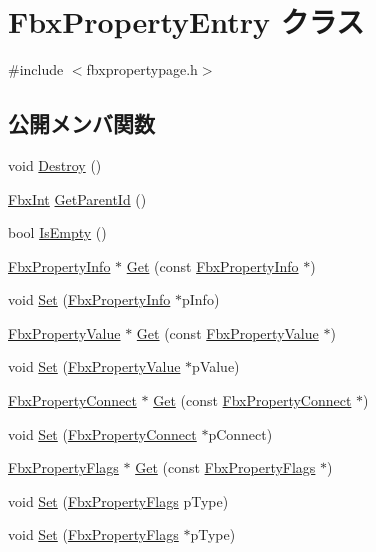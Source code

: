 \hypertarget{class_fbx_property_entry}{}\section{Fbx\+Property\+Entry クラス}
\label{class_fbx_property_entry}


{\ttfamily \#include $<$fbxpropertypage.\+h$>$}

\subsection*{公開メンバ関数}
\begin{DoxyCompactItemize}
\item 
void \hyperlink{class_fbx_property_entry_af8621889726e9c80d78bfabc039720dc}{Destroy} ()
\item 
\hyperlink{fbxtypes_8h_a088fa96de3b0b3ea69f0f6afef525dfb}{Fbx\+Int} \hyperlink{class_fbx_property_entry_a56b169256d5fa6b43c2a054a55a34c30}{Get\+Parent\+Id} ()
\item 
bool \hyperlink{class_fbx_property_entry_a05ea4a2311ae76c4e74653dfbbca6446}{Is\+Empty} ()
\item 
\hyperlink{class_fbx_property_info}{Fbx\+Property\+Info} $\ast$ \hyperlink{class_fbx_property_entry_ae91a2951a81cd0906ffa15c6d7c9abe4}{Get} (const \hyperlink{class_fbx_property_info}{Fbx\+Property\+Info} $\ast$)
\item 
void \hyperlink{class_fbx_property_entry_ad1aae55932cd5bb6dac87c580ddf9e64}{Set} (\hyperlink{class_fbx_property_info}{Fbx\+Property\+Info} $\ast$p\+Info)
\item 
\hyperlink{class_fbx_property_value}{Fbx\+Property\+Value} $\ast$ \hyperlink{class_fbx_property_entry_a61efc16c6ef16db699eb98349d8a80db}{Get} (const \hyperlink{class_fbx_property_value}{Fbx\+Property\+Value} $\ast$)
\item 
void \hyperlink{class_fbx_property_entry_a2b8e9b06392c64c7ad2279f0cd22b26a}{Set} (\hyperlink{class_fbx_property_value}{Fbx\+Property\+Value} $\ast$p\+Value)
\item 
\hyperlink{class_fbx_property_connect}{Fbx\+Property\+Connect} $\ast$ \hyperlink{class_fbx_property_entry_a1ed023614393f180cf621fc672b701e2}{Get} (const \hyperlink{class_fbx_property_connect}{Fbx\+Property\+Connect} $\ast$)
\item 
void \hyperlink{class_fbx_property_entry_a454ced1ebe45eb69c62b9618a6c6f5e3}{Set} (\hyperlink{class_fbx_property_connect}{Fbx\+Property\+Connect} $\ast$p\+Connect)
\item 
\hyperlink{class_fbx_property_flags}{Fbx\+Property\+Flags} $\ast$ \hyperlink{class_fbx_property_entry_a674156824b96185a6603d7329a0dfd83}{Get} (const \hyperlink{class_fbx_property_flags}{Fbx\+Property\+Flags} $\ast$)
\item 
void \hyperlink{class_fbx_property_entry_a34f5e6c4048ed0519f6a74db1f341b2e}{Set} (\hyperlink{class_fbx_property_flags}{Fbx\+Property\+Flags} p\+Type)
\item 
void \hyperlink{class_fbx_property_entry_ad0196c0a6783551c672a98a97450ad96}{Set} (\hyperlink{class_fbx_property_flags}{Fbx\+Property\+Flags} $\ast$p\+Type)
\end{DoxyCompactItemize}
